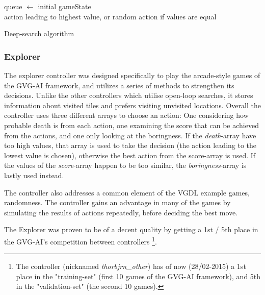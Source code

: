 \documentclass[a4paper,titlepage,final]{report}
\begin{document}
\begin{algorithm}[H]
queue $\gets$ initial gameState \\
\Return action leading to highest value, or random action if values are equal
\caption{Deep-search algorithm}
\end{algorithm}

\subsubsection*{Explorer}
The explorer controller was designed specifically to play the arcade-style games of the GVG-AI framework, and utilizes a series of methods to strengthen its decisions. 
Unlike the other controllers which utilise open-loop searches, it stores information about visited tiles and prefers visiting unvisited locations. 
Overall the controller uses three different arrays to choose an action: One considering how probable death is from each action, one examining the score that can be achieved from the actions, and one only looking at the boringness.
If the \textit{death}-array have too high values, that array is used to take the decision (the action leading to the lowest value is chosen), otherwise the best action from the score-array is used.
If the values of the \textit{score}-array happen to be too similar, the \textit{boringness}-array is lastly used instead.

The controller also addresses a common element of the VGDL example games, randomness. The controller gains an advantage in many of the games by simulating the results of actions repeatedly, before deciding the best move.

The Explorer was proven to be of a decent quality by getting a 1st / 5th place in the GVG-AI's competition between controllers \footnote{The controller (nicknamed \textit{thorbjrn_other}) has of now (28/02-2015) a 1st place in the "training-set" (first 10 games of the GVG-AI framework), and 5th in the "validation-set" (the second 10 games).}.
\end{document}
